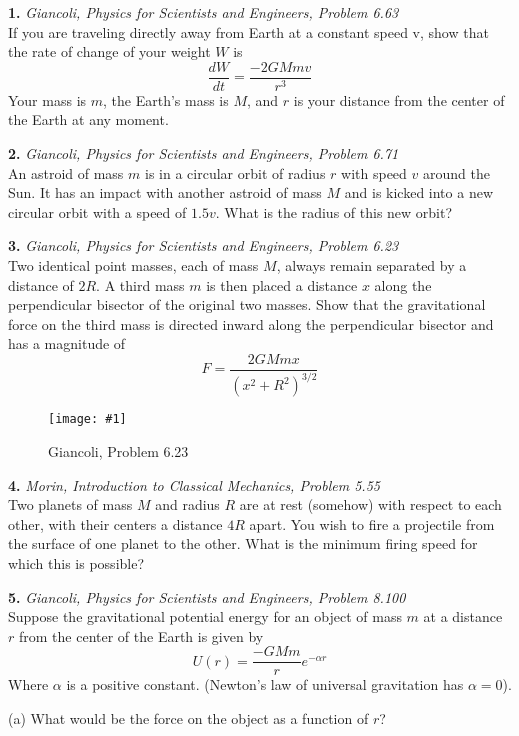 \documentclass[11pt]{article}
\newcommand{\fig}[4]{
    \begin{figure}[H]
        \centering
        \texttt{[image: \#1]}
        \caption{#2}
        \label{exp4fit}
    \end{figure}
}
\theoremstyle{gangnamstyle}{\newtheorem{definition}{Definition}[]}
\theoremstyle{gangnamstyle}{\newtheorem{example}{Example}[]}
\theoremstyle{gangnamstyle}{\newtheorem{problem}{Problem}[]}
\begin{document}
\textbf{1.} \textit{Giancoli, Physics for Scientists and Engineers, Problem 6.63} \\
If you are traveling directly away from Earth at a constant speed v, show that the rate of change of your weight $W$ is
\[ \frac{dW}{dt} = \frac{-2GMmv}{r^3} \]
Your mass is $m$, the Earth's mass is $M$, and $r$ is your distance from the center of the Earth at any moment.

\pagebreak

\textbf{2.} \textit{Giancoli, Physics for Scientists and Engineers, Problem 6.71} \\
An astroid of mass $m$ is in a circular orbit of radius $r$ with speed $v$ around the Sun. It has an impact with another astroid of mass $M$ and is kicked into a new circular orbit with a speed of $1.5 v$. What is the radius of this new orbit? 

\pagebreak

\textbf{3.} \textit{Giancoli, Physics for Scientists and Engineers, Problem 6.23} \\
Two identical point masses, each of mass $M$, always remain separated by a distance of $2R$. A third mass $m$ is then placed a distance $x$ along the perpendicular bisector of the original two masses. Show that the gravitational force on the third mass is directed inward along the perpendicular bisector and has a magnitude of
\[ F = \frac{2GMmx}{(x^2 + R^2)^{3/2}} \]
\fig{figs/0716/g623.png}{Giancoli, Problem 6.23}{0.5}{0}

\pagebreak

\textbf{4.} \textit{Morin, Introduction to Classical Mechanics, Problem 5.55} \\
Two planets of mass $M$ and radius $R$ are at rest (somehow) with respect to each other, with their centers a distance $4R$ apart. You wish to fire a projectile from the surface of one planet to the other. What is the minimum firing speed for which this is possible?

\pagebreak

\textbf{5.} \textit{Giancoli, Physics for Scientists and Engineers, Problem 8.100} \\
Suppose the gravitational potential energy for an object of mass $m$ at a distance $r$ from the center of the Earth is given by
\[ U(r) = \frac{-GMm}{r}e^{-\alpha r} \]
Where $\alpha$ is a positive constant. (Newton’s law of universal gravitation has $\alpha = 0$). 

(a) What would be the force on the object as a function of $r$? 
\end{document}
